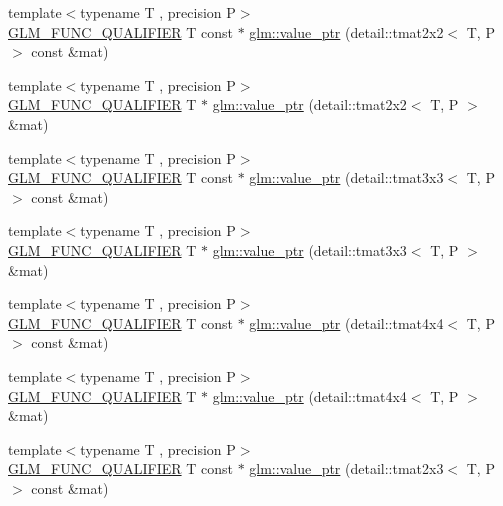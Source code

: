 \begin{DoxyCompactItemize}
\item 
{\footnotesize template$<$typename T , precision P$>$ }\\\hyperlink{setup_8hpp_a33fdea6f91c5f834105f7415e2a64407}{G\+L\+M\+\_\+\+F\+U\+N\+C\+\_\+\+Q\+U\+A\+L\+I\+F\+I\+ER} T const  $\ast$ \hyperlink{group__gtc__type__ptr_ga013fcf415d78cc3aa9273c5d4f780325}{glm\+::value\+\_\+ptr} (detail\+::tmat2x2$<$ T, P $>$ const \&mat)
\item 
{\footnotesize template$<$typename T , precision P$>$ }\\\hyperlink{setup_8hpp_a33fdea6f91c5f834105f7415e2a64407}{G\+L\+M\+\_\+\+F\+U\+N\+C\+\_\+\+Q\+U\+A\+L\+I\+F\+I\+ER} T $\ast$ \hyperlink{group__gtc__type__ptr_ga11e5b6c0d7d5d2627df624bb4b219f20}{glm\+::value\+\_\+ptr} (detail\+::tmat2x2$<$ T, P $>$ \&mat)
\item 
{\footnotesize template$<$typename T , precision P$>$ }\\\hyperlink{setup_8hpp_a33fdea6f91c5f834105f7415e2a64407}{G\+L\+M\+\_\+\+F\+U\+N\+C\+\_\+\+Q\+U\+A\+L\+I\+F\+I\+ER} T const  $\ast$ \hyperlink{group__gtc__type__ptr_ga78acb1fd15ce7d1d2861493fac9693ec}{glm\+::value\+\_\+ptr} (detail\+::tmat3x3$<$ T, P $>$ const \&mat)
\item 
{\footnotesize template$<$typename T , precision P$>$ }\\\hyperlink{setup_8hpp_a33fdea6f91c5f834105f7415e2a64407}{G\+L\+M\+\_\+\+F\+U\+N\+C\+\_\+\+Q\+U\+A\+L\+I\+F\+I\+ER} T $\ast$ \hyperlink{group__gtc__type__ptr_gaad64150511d5c6a2d2c7afec724e4064}{glm\+::value\+\_\+ptr} (detail\+::tmat3x3$<$ T, P $>$ \&mat)
\item 
{\footnotesize template$<$typename T , precision P$>$ }\\\hyperlink{setup_8hpp_a33fdea6f91c5f834105f7415e2a64407}{G\+L\+M\+\_\+\+F\+U\+N\+C\+\_\+\+Q\+U\+A\+L\+I\+F\+I\+ER} T const  $\ast$ \hyperlink{group__gtc__type__ptr_gaa99522f78635f6949ebf82f065bafa94}{glm\+::value\+\_\+ptr} (detail\+::tmat4x4$<$ T, P $>$ const \&mat)
\item 
{\footnotesize template$<$typename T , precision P$>$ }\\\hyperlink{setup_8hpp_a33fdea6f91c5f834105f7415e2a64407}{G\+L\+M\+\_\+\+F\+U\+N\+C\+\_\+\+Q\+U\+A\+L\+I\+F\+I\+ER} T $\ast$ \hyperlink{group__gtc__type__ptr_ga46c85fe444b7260c496be5fe0c146e87}{glm\+::value\+\_\+ptr} (detail\+::tmat4x4$<$ T, P $>$ \&mat)
\item 
{\footnotesize template$<$typename T , precision P$>$ }\\\hyperlink{setup_8hpp_a33fdea6f91c5f834105f7415e2a64407}{G\+L\+M\+\_\+\+F\+U\+N\+C\+\_\+\+Q\+U\+A\+L\+I\+F\+I\+ER} T const  $\ast$ \hyperlink{group__gtc__type__ptr_gad5c4faad7a4553c875bc45656fcae73c}{glm\+::value\+\_\+ptr} (detail\+::tmat2x3$<$ T, P $>$ const \&mat)

\end{DoxyCompactItemize}
